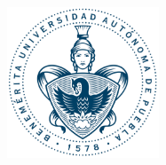 \hskip-1.5cm
\begin{minipage}[c][10cm][s]{5cm} 
  \begin{center}
    \includegraphics[height=4.5cm]{graphs/buap}\\[10pt]
     \textcolor{-red!75!green!50}{\hskip2pt\vrule width2pt height18cm\hskip1mm
     \vrule width1pt height18cm\\[10pt]}
  \end{center}
\end{minipage}
